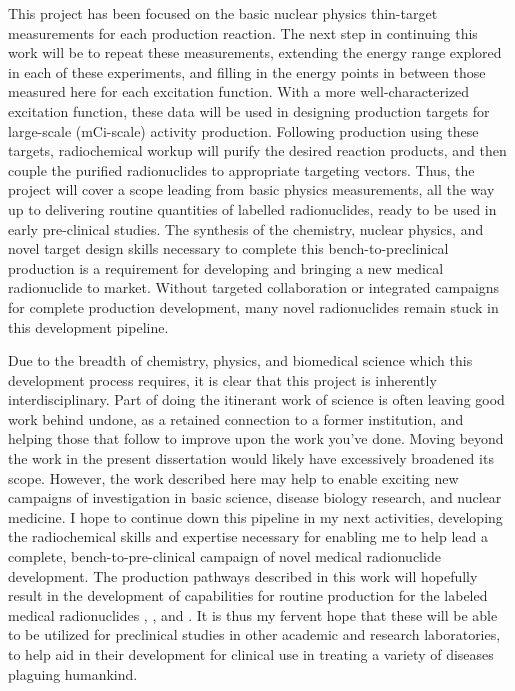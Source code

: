 This project has been focused on  the basic nuclear physics thin-target measurements for each production reaction.
The next step in continuing this work will be to repeat these measurements, extending the energy range explored in each of these experiments, and filling in the energy points in between those measured here for each excitation function. 
With a more well-characterized excitation function, these data  will be used in designing production targets for large-scale (mCi-scale) activity production. 
Following production using these targets, radiochemical workup will purify the desired reaction products, and then couple the purified radionuclides to appropriate targeting vectors. 
Thus, the project will cover a scope leading from basic physics measurements, all the way up to delivering routine quantities of labelled radionuclides, ready to be used in early pre-clinical studies. 
The synthesis of the chemistry, nuclear physics, and novel target design skills necessary to complete this bench-to-preclinical production is a requirement for developing and bringing a new medical radionuclide to market.
Without targeted collaboration or integrated campaigns for complete production development, many novel radionuclides remain stuck in this development pipeline.



Due to the breadth of chemistry, physics, and biomedical science which this development process requires, it is clear that this project is inherently interdisciplinary.
Part of doing the itinerant work of science is often leaving good work behind undone, as a retained connection to a former institution, and helping those that follow  to improve upon the work you've done. 
Moving beyond the  work in the present dissertation would likely have excessively broadened its scope.
However, the work described here may help to enable exciting new campaigns of investigation in basic science, disease biology research, and nuclear medicine.
I hope to continue down this pipeline in my next activities, developing the radiochemical skills and expertise necessary for enabling me to help lead a complete, bench-to-pre-clinical campaign of novel medical radionuclide development.
The production pathways described in this work  will hopefully result in the development of capabilities for routine production for the labeled medical radionuclides  ,   , and . 
It is thus my fervent hope that these will be able to be utilized for preclinical studies in other  academic and research laboratories, to help aid in their development for clinical use in treating a variety of diseases plaguing humankind. 



